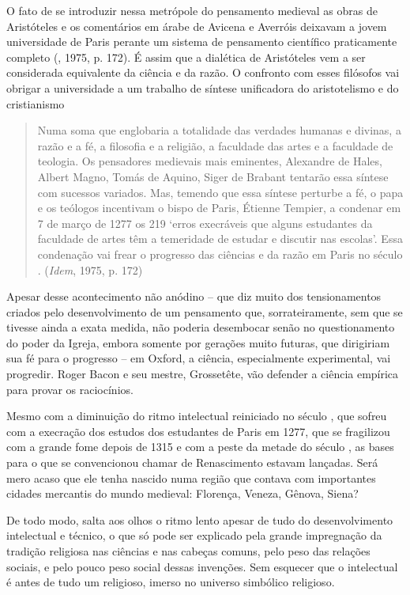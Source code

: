 O fato de se introduzir nessa metrópole do pensamento medieval as obras
de Aristóteles e os comentários em árabe de Avicena e Averróis deixavam
a jovem universidade de Paris perante um sistema de pensamento
científico praticamente completo (, 1975, p. 172). É assim que a
dialética de Aristóteles vem a ser considerada equivalente da ciência e
da razão. O confronto com esses filósofos vai obrigar a universidade a
um trabalho de síntese unificadora do aristotelismo e do cristianismo

\begin{quote}
Numa soma que englobaria a totalidade das verdades humanas e divinas, a
razão e a fé, a filosofia e a religião, a faculdade das artes e a
faculdade de teologia. Os pensadores medievais mais eminentes, Alexandre
de Hales, Albert Magno, Tomás de Aquino, Siger de Brabant tentarão essa
síntese com sucessos variados. Mas, temendo que essa síntese perturbe a
fé, o papa e os teólogos incentivam o bispo de Paris, Étienne Tempier, a
condenar em 7 de março de 1277 os 219 `erros execráveis que alguns
estudantes da faculdade de artes têm a temeridade de estudar e discutir
nas escolas'. Essa condenação vai frear o progresso das ciências e da
razão em Paris no século . (\emph{Idem}, 1975, p. 172)
\end{quote}

Apesar desse acontecimento não anódino -- que diz muito dos
tensionamentos criados pelo desenvolvimento de um pensamento que,
sorrateiramente, sem que se tivesse ainda a exata medida, não poderia
desembocar senão no questionamento do poder da Igreja, embora somente
por gerações muito futuras, que dirigiriam sua fé para o progresso -- em
Oxford, a ciência, especialmente experimental, vai progredir. Roger
Bacon e seu mestre, Grossetête, vão defender a ciência empírica para
provar os raciocínios.

Mesmo com a diminuição do ritmo intelectual reiniciado no século , que
sofreu com a execração dos estudos dos estudantes de Paris em 1277, que
se fragilizou com a grande fome depois de 1315 e com a peste da metade
do século , as bases para o que se convencionou chamar de
Renascimento estavam lançadas. Será mero acaso que ele tenha nascido
numa região que contava com importantes cidades mercantis do mundo
medieval: Florença, Veneza, Gênova, Siena?

De todo modo, salta aos olhos o ritmo lento apesar de tudo do
desenvolvimento intelectual e técnico, o que só pode ser explicado pela
grande impregnação da tradição religiosa nas ciências e nas cabeças
comuns, pelo peso das relações sociais, e pelo pouco peso social dessas
invenções. Sem esquecer que o intelectual é antes de tudo um religioso,
imerso no universo simbólico religioso.

